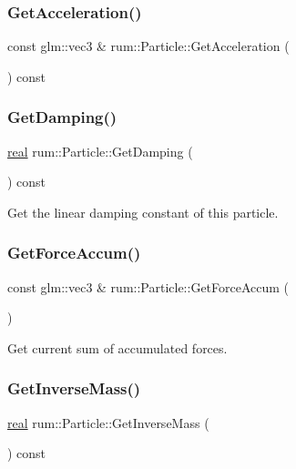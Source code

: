 \subsubsection{\texorpdfstring{Get\+Acceleration()}{GetAcceleration()}}
{\footnotesize\ttfamily const glm\+::vec3 \& rum\+::\+Particle\+::\+Get\+Acceleration (\begin{DoxyParamCaption}{ }\end{DoxyParamCaption}) const}

\mbox{\label{classrum_1_1_particle_a8635e9e5ab669d9d754195a265293dde}} 
\subsubsection{\texorpdfstring{Get\+Damping()}{GetDamping()}}
{\footnotesize\ttfamily \hyperlink{namespacerum_a7e8cca23573d5eaead0f138cbaa4862c}{real} rum\+::\+Particle\+::\+Get\+Damping (\begin{DoxyParamCaption}{ }\end{DoxyParamCaption}) const}

Get the linear damping constant of this particle. \mbox{\label{classrum_1_1_particle_aa13821d1abbcc67a90d37936b58c632b}} 
\subsubsection{\texorpdfstring{Get\+Force\+Accum()}{GetForceAccum()}}
{\footnotesize\ttfamily const glm\+::vec3 \& rum\+::\+Particle\+::\+Get\+Force\+Accum (\begin{DoxyParamCaption}{ }\end{DoxyParamCaption})}

Get current sum of accumulated forces. \mbox{\label{classrum_1_1_particle_a97e3662e7232daf4f2eabb79e4e06a3e}} 
\subsubsection{\texorpdfstring{Get\+Inverse\+Mass()}{GetInverseMass()}}
{\footnotesize\ttfamily \hyperlink{namespacerum_a7e8cca23573d5eaead0f138cbaa4862c}{real} rum\+::\+Particle\+::\+Get\+Inverse\+Mass (\begin{DoxyParamCaption}{ }\end{DoxyParamCaption}) const}

